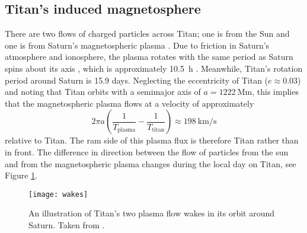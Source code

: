 \documentclass[12pt, parskip=full*, abstract]{scrartcl}
\begin{document}
\subsection{Titan's induced magnetosphere}

There are two flows of charged particles across Titan; one is from the Sun and one is from Saturn's magnetospheric plasma \parencite{ionosphere-magnetosphere-interaction-coates}. Due to friction in Saturn's atmosphere and ionosphere, the plasma rotates with the same period as Saturn spins about its axis \parencite{solar-system-magnetospheres}, which is approximately \SI{10.5}{\hour} \parencite{fundamental-planetary-science}. Meanwhile, Titan's rotation period around Saturn is 15.9 days. Neglecting the eccentricity of Titan ($e\approx0.03$) and noting that Titan orbits with a semimajor axis of $a=\SI{1222}{\mega\metre}$, this implies that the magnetospheric plasma flows at a velocity of approximately
\begin{equation}
	2\pi a\left(\frac{1}{T_\text{plasma}} - \frac{1}{T_\text{titan}}\right)\approx\SI{198}{\kilo\metre\per\second}
\end{equation}
relative to Titan. The ram side of this plasma flux is therefore  Titan rather than in front. The difference in direction between the flow of particles from the sun and from the magnetospheric plasma changes during the local day on Titan, see Figure \ref{wakes}. 

\begin{figure}[htbp]
	\centering
	\texttt{[image: wakes]}
	\caption{An illustration of Titan's two plasma flow wakes in its orbit around Saturn. Taken from \textcite{ionosphere-magnetosphere-interaction-coates}.}
	\label{wakes}
\end{figure}



\end{document}
